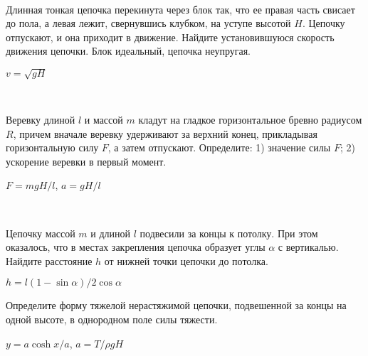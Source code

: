 \begin{ex}
\hspace{0pt} \\
\begin{minipage}{.65\textwidth}
Длинная тонкая цепочка перекинута через блок так, что ее правая часть свисает до пола, а левая лежит, свернувшись клубком, на уступе высотой $H$. Цепочку отпускают, и она приходит в движение. Найдите установившуюся скорость движения цепочки. Блок идеальный, цепочка неупругая.
\end{minipage}
\begin{minipage}{.35\textwidth}
\centering

\end{minipage}
\begin{ans}
$v = \sqrt{gH}$
\end{ans}
\end{ex}

\begin{ex}
\hspace{0pt} \\
\begin{minipage}{.65\textwidth}
Веревку длиной $l$ и массой $m$ кладут на гладкое горизонтальное бревно радиусом $R$, причем вначале веревку удерживают за верхний конец, прикладывая горизонтальную силу $F$, а затем отпускают. Определите: 1) значение силы $F$; 2) ускорение веревки в первый момент.
\end{minipage}
\begin{minipage}{.35\textwidth}
\centering

\end{minipage}
\begin{ans}
$F = mgH/l$, $a = gH/l$
\end{ans}
\end{ex}

\begin{ex}
\hspace{0pt} \\
\begin{minipage}{.65\textwidth}
Цепочку массой $m$ и длиной $l$ подвесили за концы к потолку. При этом оказалось, что в местах закрепления цепочка образует углы $\alpha $ с вертикалью. Найдите расстояние $h$ от нижней точки цепочки до потолка.
\end{minipage}
\begin{minipage}{.35\textwidth}
\centering

\end{minipage}
\begin{ans}
$h = l(1 - \sin \alpha)/2 \cos \alpha$
\end{ans}
\end{ex}

\begin{ex}
Определите форму тяжелой нерастяжимой цепочки, подвешенной за концы на одной высоте, в однородном поле силы тяжести.
\begin{ans}
$y = a \cosh x/a$, $a = T/\rho g H$
\end{ans}
\end{ex}
